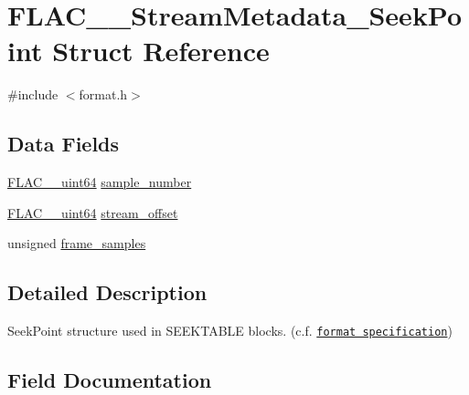 \hypertarget{struct_f_l_a_c_____stream_metadata___seek_point}{}\section{F\+L\+A\+C\+\_\+\+\_\+\+Stream\+Metadata\+\_\+\+Seek\+Point Struct Reference}
\label{struct_f_l_a_c_____stream_metadata___seek_point}


{\ttfamily \#include $<$format.\+h$>$}

\subsection*{Data Fields}
\begin{DoxyCompactItemize}
\item 
\hyperlink{ordinals_8h_aa78c8c70a3eb8a58af7436f278acde8e}{F\+L\+A\+C\+\_\+\+\_\+uint64} \hyperlink{struct_f_l_a_c_____stream_metadata___seek_point_a96a62923f1443fd3a5a3498e701e6ecf}{sample\+\_\+number}
\item 
\hyperlink{ordinals_8h_aa78c8c70a3eb8a58af7436f278acde8e}{F\+L\+A\+C\+\_\+\+\_\+uint64} \hyperlink{struct_f_l_a_c_____stream_metadata___seek_point_a6028398e99f937b002618af677d32c9f}{stream\+\_\+offset}
\item 
unsigned \hyperlink{struct_f_l_a_c_____stream_metadata___seek_point_a247ce3f0d45a56c202e623742309fe61}{frame\+\_\+samples}
\end{DoxyCompactItemize}


\subsection{Detailed Description}
Seek\+Point structure used in S\+E\+E\+K\+T\+A\+B\+LE blocks. (c.\+f. \href{../format.html#seekpoint}{\tt format specification}) 

\subsection{Field Documentation}
\mbox{\label{struct_f_l_a_c_____stream_metadata___seek_point_a247ce3f0d45a56c202e623742309fe61}} 
